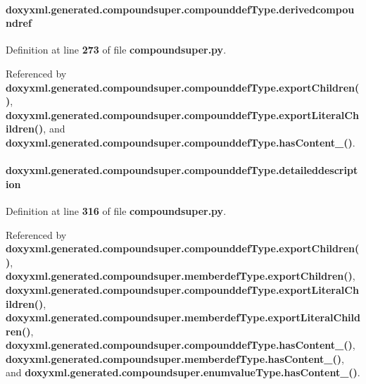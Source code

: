 \paragraph[{derivedcompoundref}]{\setlength{\rightskip}{0pt plus 5cm}doxyxml.\+generated.\+compoundsuper.\+compounddef\+Type.\+derivedcompoundref}\label{classdoxyxml_1_1generated_1_1compoundsuper_1_1compounddefType_afda53560714d08a4d5a37c9715859375}


Definition at line {\bf 273} of file {\bf compoundsuper.\+py}.



Referenced by {\bf doxyxml.\+generated.\+compoundsuper.\+compounddef\+Type.\+export\+Children()}, {\bf doxyxml.\+generated.\+compoundsuper.\+compounddef\+Type.\+export\+Literal\+Children()}, and {\bf doxyxml.\+generated.\+compoundsuper.\+compounddef\+Type.\+has\+Content\+\_\+()}.

\paragraph[{detaileddescription}]{\setlength{\rightskip}{0pt plus 5cm}doxyxml.\+generated.\+compoundsuper.\+compounddef\+Type.\+detaileddescription}\label{classdoxyxml_1_1generated_1_1compoundsuper_1_1compounddefType_ab5acc42a295595c20d9534746d107a5c}


Definition at line {\bf 316} of file {\bf compoundsuper.\+py}.



Referenced by {\bf doxyxml.\+generated.\+compoundsuper.\+compounddef\+Type.\+export\+Children()}, {\bf doxyxml.\+generated.\+compoundsuper.\+memberdef\+Type.\+export\+Children()}, {\bf doxyxml.\+generated.\+compoundsuper.\+compounddef\+Type.\+export\+Literal\+Children()}, {\bf doxyxml.\+generated.\+compoundsuper.\+memberdef\+Type.\+export\+Literal\+Children()}, {\bf doxyxml.\+generated.\+compoundsuper.\+compounddef\+Type.\+has\+Content\+\_\+()}, {\bf doxyxml.\+generated.\+compoundsuper.\+memberdef\+Type.\+has\+Content\+\_\+()}, and {\bf doxyxml.\+generated.\+compoundsuper.\+enumvalue\+Type.\+has\+Content\+\_\+()}.


